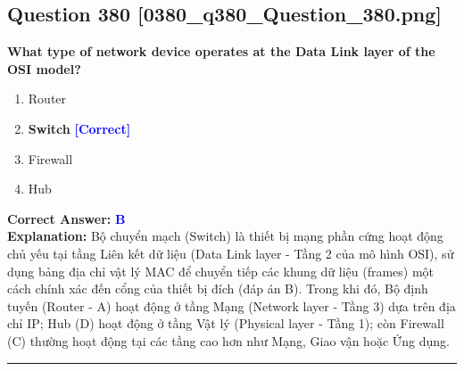 \documentclass[11pt,a4paper]{article}
\begin{document}
\begin{minipage}{\textwidth}
\subsection*{Question 380 \quad \footnotesize{[0380\_q380\_Question\_380.png]}}
\noindent \textbf{What type of network device operates at the Data Link layer of the OSI model?}

\begin{enumerate}[label=\Alph*.]
    \item Router
    \item \textbf{Switch} \hfill \textcolor{blue}{\textbf{[Correct]}}
    \item Firewall
    \item Hub
\end{enumerate}

\noindent \textbf{Correct Answer:} \textcolor{blue}{\textbf{B}} \\[2pt]
\noindent \textbf{Explanation:} Bộ chuyển mạch (Switch) là thiết bị mạng phần cứng hoạt động chủ yếu tại tầng Liên kết dữ liệu (Data Link layer - Tầng 2 của mô hình OSI), sử dụng bảng địa chỉ vật lý MAC để chuyển tiếp các khung dữ liệu (frames) một cách chính xác đến cổng của thiết bị đích (đáp án B). Trong khi đó, Bộ định tuyến (Router - A) hoạt động ở tầng Mạng (Network layer - Tầng 3) dựa trên địa chỉ IP; Hub (D) hoạt động ở tầng Vật lý (Physical layer - Tầng 1); còn Firewall (C) thường hoạt động tại các tầng cao hơn như Mạng, Giao vận hoặc Ứng dụng.

\par\vspace{0.3cm}
\hrule
\vspace{0.3cm}
\end{minipage}
\end{document}
